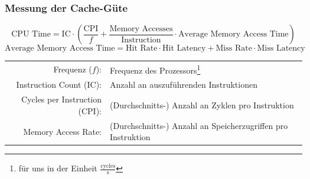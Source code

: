 \documentclass[
  german,            %
  aspectratio=169,    %
]{tumbeamer}
\begin{document}
\begin{frame}
  \frametitle{Messung der Cache-Güte}
  \vfill
  \begin{equation*}
    \text{CPU Time} = \text{IC} \cdot \left(\dfrac{\text{CPI}}{f} + \frac{\text{Memory Accesses}}{\text{Instruction}} \cdot \text{Average Memory Access Time}\right)
  \end{equation*}
  \begin{equation*}
    \text{Average Memory Access Time} = \text{Hit Rate} \cdot \text{Hit Latency} + \text{Miss Rate} \cdot \text{Miss Latency}
  \end{equation*}
  \vfill
  {\renewcommand{\arraystretch}{1.4}
      \begin{tabular}{rl}
          Frequenz ($f$): & Frequenz des Prozessors\footnote{für uns in der Einheit $\frac{\text{cycles}}{\text{s}}$}\\
          Instruction Count (IC): & Anzahl an auszuführenden Instruktionen\\
          Cycles per Instruction (CPI): & (Durchschnitts-) Anzahl an Zyklen pro Instruktion\\
          Memory Access Rate: & (Durchschnitts-) Anzahl an Speicherzugriffen pro Instruktion\\
  \end{tabular}}
\end{frame}
\end{document}
